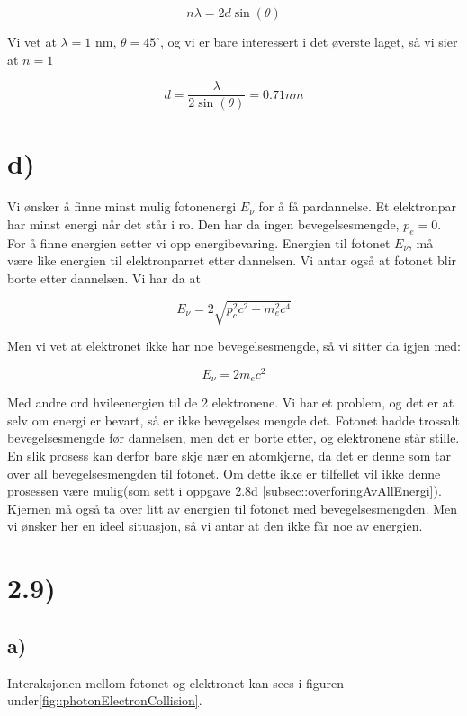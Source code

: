 \documentclass[a4paper,norsk, 10pt]{article}
\begin{document}
$$
n\lambda = 2d\sin(\theta)
$$

Vi vet at $\lambda = 1$ nm, $\theta = 45^{\circ}$, og vi er bare interessert i det øverste laget, så vi sier at $n = 1$

$$
d = \frac{\lambda}{2\sin(\theta)} = 0.71 nm
$$

\section*{d)}
Vi ønsker å finne minst mulig fotonenergi $E_{\nu}$ for å få pardannelse. Et elektronpar har minst energi når det står i ro. Den har da ingen bevegelsesmengde, $p_e = 0$. For å finne energien setter vi opp energibevaring. Energien til fotonet $E_{\nu}$, må være like energien til elektronparret etter dannelsen. Vi antar også at fotonet blir borte etter dannelsen. Vi har da at

$$
E_{\nu} = 2\sqrt{p_c^2c^2 + m_e^2c^4}
$$

Men vi vet at elektronet ikke har noe bevegelsesmengde, så vi sitter da igjen med:

$$
E_{\nu} = 2m_ec^2
$$

Med andre ord hvileenergien til de 2 elektronene. Vi har et problem, og det er at selv om energi er bevart, så er ikke bevegelses mengde det. Fotonet hadde trossalt bevegelsesmengde før dannelsen, men det er borte etter, og elektronene står stille. En slik prosess kan derfor bare skje nær en atomkjerne, da det er denne som tar over all bevegelsesmengden til fotonet. Om dette ikke er tilfellet vil ikke denne prosessen være mulig(som sett i oppgave 2.8d \ref{subsec::overforingAvAllEnergi}). Kjernen må også ta over litt av energien til fotonet med bevegelsesmengden. Men vi ønsker her en ideel situasjon, så vi antar at den ikke får noe av energien.

\section*{2.9)}

\subsection*{a)}
Interaksjonen mellom fotonet og elektronet kan sees i figuren under\ref{fig::photonElectronCollision}.
\end{document}
